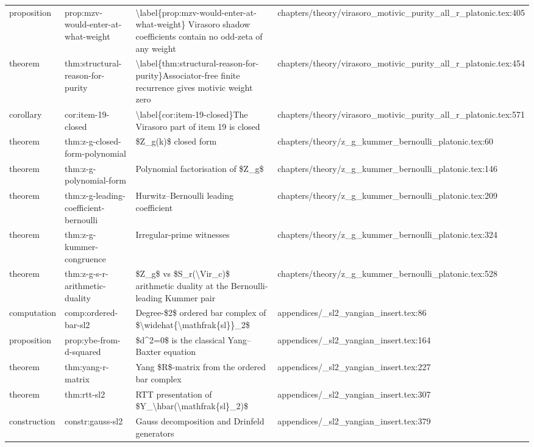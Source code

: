 \documentclass[11pt]{article}
\begin{document}
\begin{longtable}{L{0.10\textwidth}L{0.26\textwidth}L{0.42\textwidth}L{0.22\textwidth}}
proposition & prop:mzv-would-enter-at-what-weight & \textbackslash{}label\{prop:mzv-would-enter-at-what-weight\} Virasoro shadow coefficients contain no odd-zeta of any weight & chapters/theory/virasoro\_motivic\_purity\_all\_r\_platonic.tex:405\\
theorem & thm:structural-reason-for-purity & \textbackslash{}label\{thm:structural-reason-for-purity\}Associator-free finite recurrence gives motivic weight zero & chapters/theory/virasoro\_motivic\_purity\_all\_r\_platonic.tex:454\\
corollary & cor:item-19-closed & \textbackslash{}label\{cor:item-19-closed\}The Virasoro part of item 19 is closed & chapters/theory/virasoro\_motivic\_purity\_all\_r\_platonic.tex:571\\
theorem & thm:z-g-closed-form-polynomial & \$Z\_g(k)\$ closed form & chapters/theory/z\_g\_kummer\_bernoulli\_platonic.tex:60\\
theorem & thm:z-g-polynomial-form & Polynomial factorisation of \$Z\_g\$ & chapters/theory/z\_g\_kummer\_bernoulli\_platonic.tex:146\\
theorem & thm:z-g-leading-coefficient-bernoulli & Hurwitz--Bernoulli leading coefficient & chapters/theory/z\_g\_kummer\_bernoulli\_platonic.tex:209\\
theorem & thm:z-g-kummer-congruence & Irregular-prime witnesses & chapters/theory/z\_g\_kummer\_bernoulli\_platonic.tex:324\\
theorem & thm:z-g-s-r-arithmetic-duality & \$Z\_g\$ vs \$S\_r(\textbackslash{}Vir\_c)\$ arithmetic duality at the Bernoulli-leading Kummer pair & chapters/theory/z\_g\_kummer\_bernoulli\_platonic.tex:528\\
computation & comp:ordered-bar-sl2 & Degree-\$2\$ ordered bar complex of \$\textbackslash{}widehat\{\textbackslash{}mathfrak\{sl\}\}\_2\$ & appendices/\_sl2\_yangian\_insert.tex:86\\
proposition & prop:ybe-from-d-squared & \$d\textasciicircum{}2=0\$ is the classical Yang--Baxter equation & appendices/\_sl2\_yangian\_insert.tex:164\\
theorem & thm:yang-r-matrix & Yang \$R\$-matrix from the ordered bar complex & appendices/\_sl2\_yangian\_insert.tex:227\\
theorem & thm:rtt-sl2 & RTT presentation of \$Y\_\textbackslash{}hbar(\textbackslash{}mathfrak\{sl\}\_2)\$ & appendices/\_sl2\_yangian\_insert.tex:307\\
construction & constr:gauss-sl2 & Gauss decomposition and Drinfeld generators & appendices/\_sl2\_yangian\_insert.tex:379\\

\end{longtable}
\end{document}
